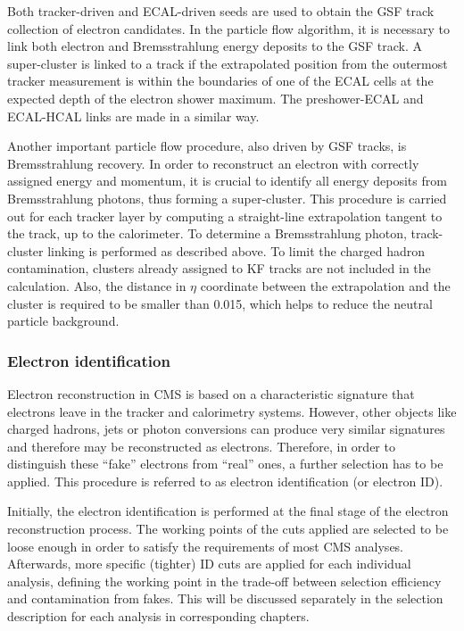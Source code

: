 Both tracker-driven and ECAL-driven seeds are used to obtain the GSF track collection of electron candidates. In the
particle flow algorithm, it is necessary to link both electron and Bremsstrahlung energy deposits to the GSF track. A
super-cluster is linked to a track if the extrapolated position from the outermost tracker measurement is within the
boundaries of one of the ECAL cells at the expected depth of the electron shower maximum. The preshower-ECAL and
ECAL-HCAL links are made in a similar way.

Another important particle flow procedure, also driven by GSF tracks, is Bremsstrahlung recovery. In order to
reconstruct an electron with correctly assigned energy and momentum, it is crucial to identify all energy deposits from
Bremsstrahlung photons, thus forming a super-cluster. This procedure is carried out for each tracker layer by computing
a straight-line extrapolation tangent to the track, up to the calorimeter. To determine a Bremsstrahlung photon,
track-cluster linking is performed as described above. To limit the charged hadron contamination, clusters already
assigned to KF tracks are not included in the calculation. Also, the distance in $\eta$ coordinate between the
extrapolation and the cluster is required to be smaller than \num{0.015}, which helps to reduce the neutral particle
background.

\subsubsection{Electron identification}
\label{sss:electron_id}

Electron reconstruction in CMS is based on a characteristic signature that electrons leave in the tracker and
calorimetry systems. However, other objects like charged hadrons, jets or photon conversions can produce very similar
signatures and therefore may be reconstructed as electrons. Therefore, in order to distinguish these ``fake'' electrons
from ``real'' ones, a further selection has to be applied. This procedure is referred to as electron identification (or
electron ID).

Initially, the electron identification is performed at the final stage of the electron reconstruction process. The
working points of the cuts applied are selected to be loose enough in order to satisfy the requirements of most CMS
analyses. Afterwards, more specific (tighter) ID cuts are applied for each individual analysis, defining the working
point in the trade-off between selection efficiency and contamination from fakes. This will be discussed separately in
the selection description for each analysis in corresponding chapters.

